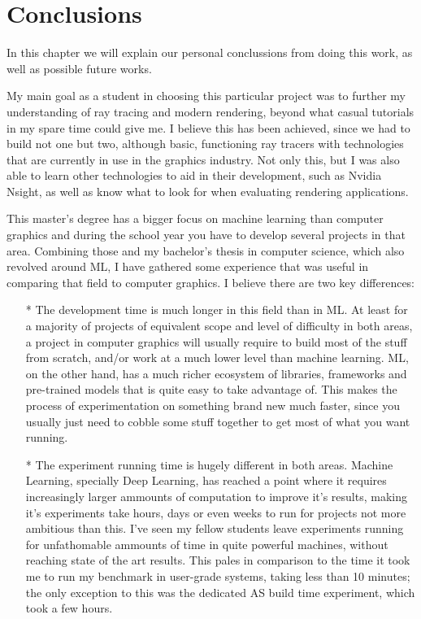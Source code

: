 \chapter{Conclusions}

In this chapter we will explain our personal conclussions from doing this work, as well as possible future works.

My main goal as a student in choosing this particular project was to further my understanding of ray tracing and modern rendering, beyond what casual tutorials in my spare time could give me. I believe this has been achieved, since we had to build not one but two, although basic, functioning ray tracers with technologies that are currently in use in the graphics industry. Not only this, but I was also able to learn other technologies to aid in their development, such as Nvidia Nsight, as well as know what to look for when evaluating rendering applications.

This master's degree has a bigger focus on machine learning than computer graphics and during the school year you have to develop several projects in that area. Combining those and my bachelor's thesis in computer science, which also revolved around ML, I have gathered some experience that was useful in comparing that field to computer graphics. I believe there are two key differences:

\begin{itemize}
  \item[*]{The development time is much longer in this field than in ML. At least for a majority of projects of equivalent scope and level of difficulty in both areas, a project in computer graphics will usually require to build most of the stuff from scratch, and/or work at a much lower level than machine learning. ML, on the other hand, has a much richer ecosystem of libraries, frameworks and pre-trained models that is quite easy to take advantage of. This makes the process of experimentation on something brand new much faster, since you usually just need to cobble some stuff together to get most of what you want running.}
  \item[*]{The experiment running time is hugely different in both areas. Machine Learning, specially Deep Learning, has reached a point where it requires increasingly larger ammounts of computation to improve it's results, making it's experiments take hours, days or even weeks to run for projects not more ambitious than this. I've seen my fellow students leave experiments running for unfathomable ammounts of time in quite powerful machines, without reaching state of the art results. This pales in comparison to the time it took me to run my benchmark in user-grade systems, taking less than 10 minutes; the only exception to this was the dedicated AS build time experiment, which took a few hours.}
\end{itemize}

